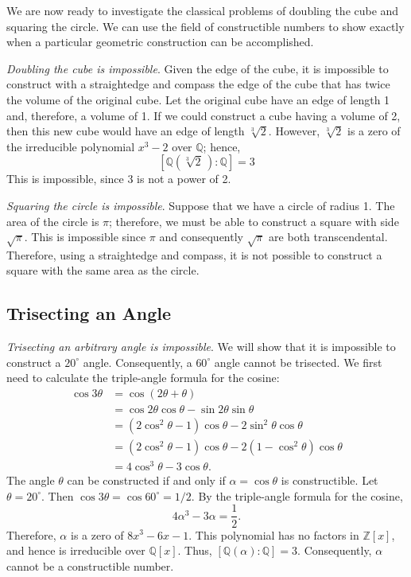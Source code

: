 We are now ready to investigate the classical problems of doubling
the cube and squaring the circle.  We can use the field of
constructible numbers to show exactly when a particular geometric
construction can be accomplished.    

 
\emph{Doubling the cube is impossible}.  Given the
edge of the cube, it is impossible to construct with a straightedge
and compass the edge of the cube that has twice the volume of the
original cube. Let the original cube have an edge of length 1 and,
therefore, a volume of  1. If we could construct a cube having a
volume of 2, then this new cube would have an edge of length
$\sqrt[3]{2}$. However, $\sqrt[3]{2}$ is a zero of the irreducible
polynomial $x^3 -2$ over ${\mathbb Q}$; hence, 
\[
[{\mathbb Q}(\sqrt[3]{2}\, ) : {\mathbb Q}] =3
\]
This is impossible, since 3 is not a power of 2.
 
 
\emph{Squaring the circle is impossible}.
Suppose that we have a circle of radius 1.  The area of the circle 
is $\pi$; therefore, we must be able to construct a square with side
$\sqrt{\pi}$. This is impossible since $\pi$ and consequently
$\sqrt{\pi}$ are both transcendental. Therefore, using a straightedge
and compass, it is not possible to construct a square with the same
area as the circle.  
 


\subsection*{Trisecting an Angle}
 

\emph{Trisecting an arbitrary angle is impossible}.  We will show that
it is impossible to construct a $20^\circ$ angle.  Consequently, a
$60^{\circ}$ angle cannot be trisected. We first need to calculate
the triple-angle formula for the cosine: 
\begin{align*}
\cos 3 \theta & = \cos( 2 \theta + \theta ) \\
& =
\cos 2 \theta \cos \theta - \sin 2 \theta \sin \theta \\
& =
( 2 \cos^2 \theta - 1) \cos \theta - 2 \sin^2 \theta \cos
\theta \\
& =
( 2 \cos^2 \theta - 1) \cos \theta - 2 (1- \cos^2 \theta)
\cos \theta \\
& =
4 \cos^3 \theta - 3 \cos \theta.
\end{align*}
The angle $\theta$ can be constructed if and only if $\alpha = \cos
\theta$ is constructible. Let $\theta = 20^{\circ}$. Then $\cos 3
\theta =  \cos 60^\circ = 1/2$. By the triple-angle formula for the
cosine,
\[
4 \alpha^3 - 3 \alpha = \frac{1}{2}.
\]
Therefore, $\alpha$ is a zero of $8 x^3 - 6 x -1$.  This polynomial
has no factors in ${\mathbb Z}[x]$, and hence is irreducible over ${\mathbb
Q}[x]$. Thus, $[{\mathbb Q}( \alpha ) : {\mathbb Q }] = 3$. Consequently,
$\alpha$ cannot be a constructible number.
 
